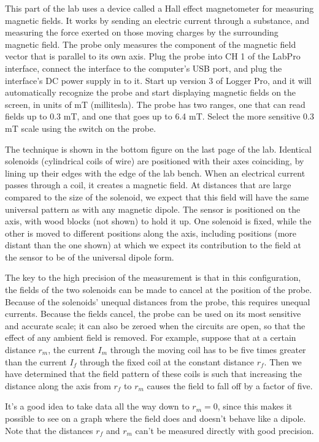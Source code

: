 This part of the lab uses a device called a Hall effect magnetometer for
measuring magnetic fields.  It works by sending an electric current through a
substance, and measuring the force exerted on those moving charges by the surrounding
magnetic field. The probe only measures the component of the
magnetic field vector that is parallel to its own axis. Plug the probe into CH 1 of the
LabPro interface, connect the interface to the computer's USB port, and
plug the interface's DC power supply in to it. Start up version 3 of Logger Pro, and
it will automatically recognize the probe and start displaying magnetic fields
on the screen, in units of mT (millitesla). The probe has two ranges, one that can
read fields up to 0.3 mT, and one that goes up to 6.4 mT.
Select the more sensitive 0.3 mT scale using the
switch on the probe. 

The technique is shown in the bottom figure on the last page of the lab. Identical solenoids
(cylindrical coils of wire) are positioned with their axes coinciding, by lining up
their edges with the edge of the lab bench. When an electrical current passes through
a coil, it creates a magnetic field. At distances that are large compared to the size
of the solenoid, we expect that this field will have the same universal pattern as with
any magnetic dipole. The sensor is positioned on the axis, with wood blocks (not shown)
to hold it up. One solenoid is fixed, while the other is moved to different positions
along the axis, including positions (more distant than the one shown) at which we expect
its contribution to the field at the sensor to be of the universal dipole form.

The key to the high precision of the measurement is that in this configuration, the
fields of the two solenoids can be made to cancel at the position of the probe. Because
of the solenoids' unequal distances from the probe, this requires unequal currents.
Because the fields cancel, the probe can be used on its most sensitive and accurate
scale; it can also be zeroed when the circuits are open, so that the effect of any
ambient field is removed. For example, suppose that at a certain distance $r_m$,
the current $I_m$ through the moving coil has to be five times greater than the current
$I_f$ through the fixed coil at the constant distance $r_f$. Then we have determined that
the field pattern of these coils is such that increasing the distance along the axis
from $r_f$ to $r_m$ causes the field to fall off by a factor of five.

It's a good idea to take data all the way down to $r_m=0$, since this makes it possible
to see on a graph where the field does and doesn't behave like a dipole. Note that the
distances $r_f$ and $r_m$ can't be measured directly with good precision.

